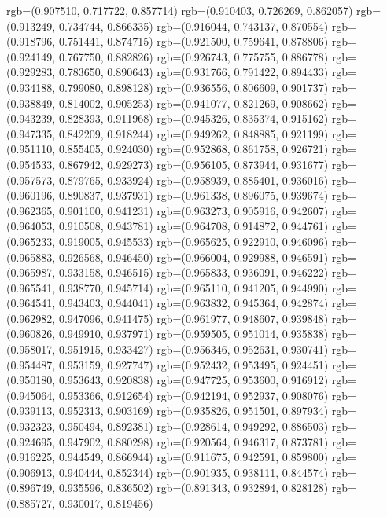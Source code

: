 {{{					rgb=(0.907510, 0.717722, 0.857714)
					rgb=(0.910403, 0.726269, 0.862057)
					rgb=(0.913249, 0.734744, 0.866335)
					rgb=(0.916044, 0.743137, 0.870554)
					rgb=(0.918796, 0.751441, 0.874715)
					rgb=(0.921500, 0.759641, 0.878806)
					rgb=(0.924149, 0.767750, 0.882826)
					rgb=(0.926743, 0.775755, 0.886778)
					rgb=(0.929283, 0.783650, 0.890643)
					rgb=(0.931766, 0.791422, 0.894433)
					rgb=(0.934188, 0.799080, 0.898128)
					rgb=(0.936556, 0.806609, 0.901737)
					rgb=(0.938849, 0.814002, 0.905253)
					rgb=(0.941077, 0.821269, 0.908662)
					rgb=(0.943239, 0.828393, 0.911968)
					rgb=(0.945326, 0.835374, 0.915162)
					rgb=(0.947335, 0.842209, 0.918244)
					rgb=(0.949262, 0.848885, 0.921199)
					rgb=(0.951110, 0.855405, 0.924030)
					rgb=(0.952868, 0.861758, 0.926721)
					rgb=(0.954533, 0.867942, 0.929273)
					rgb=(0.956105, 0.873944, 0.931677)
					rgb=(0.957573, 0.879765, 0.933924)
					rgb=(0.958939, 0.885401, 0.936016)
					rgb=(0.960196, 0.890837, 0.937931)
					rgb=(0.961338, 0.896075, 0.939674)
					rgb=(0.962365, 0.901100, 0.941231)
					rgb=(0.963273, 0.905916, 0.942607)
					rgb=(0.964053, 0.910508, 0.943781)
					rgb=(0.964708, 0.914872, 0.944761)
					rgb=(0.965233, 0.919005, 0.945533)
					rgb=(0.965625, 0.922910, 0.946096)
					rgb=(0.965883, 0.926568, 0.946450)
					rgb=(0.966004, 0.929988, 0.946591)
					rgb=(0.965987, 0.933158, 0.946515)
					rgb=(0.965833, 0.936091, 0.946222)
					rgb=(0.965541, 0.938770, 0.945714)
					rgb=(0.965110, 0.941205, 0.944990)
					rgb=(0.964541, 0.943403, 0.944041)
					rgb=(0.963832, 0.945364, 0.942874)
					rgb=(0.962982, 0.947096, 0.941475)
					rgb=(0.961977, 0.948607, 0.939848)
					rgb=(0.960826, 0.949910, 0.937971)
					rgb=(0.959505, 0.951014, 0.935838)
					rgb=(0.958017, 0.951915, 0.933427)
					rgb=(0.956346, 0.952631, 0.930741)
					rgb=(0.954487, 0.953159, 0.927747)
					rgb=(0.952432, 0.953495, 0.924451)
					rgb=(0.950180, 0.953643, 0.920838)
					rgb=(0.947725, 0.953600, 0.916912)
					rgb=(0.945064, 0.953366, 0.912654)
					rgb=(0.942194, 0.952937, 0.908076)
					rgb=(0.939113, 0.952313, 0.903169)
					rgb=(0.935826, 0.951501, 0.897934)
					rgb=(0.932323, 0.950494, 0.892381)
					rgb=(0.928614, 0.949292, 0.886503)
					rgb=(0.924695, 0.947902, 0.880298)
					rgb=(0.920564, 0.946317, 0.873781)
					rgb=(0.916225, 0.944549, 0.866944)
					rgb=(0.911675, 0.942591, 0.859800)
					rgb=(0.906913, 0.940444, 0.852344)
					rgb=(0.901935, 0.938111, 0.844574)
					rgb=(0.896749, 0.935596, 0.836502)
					rgb=(0.891343, 0.932894, 0.828128)
					rgb=(0.885727, 0.930017, 0.819456)
}}}
